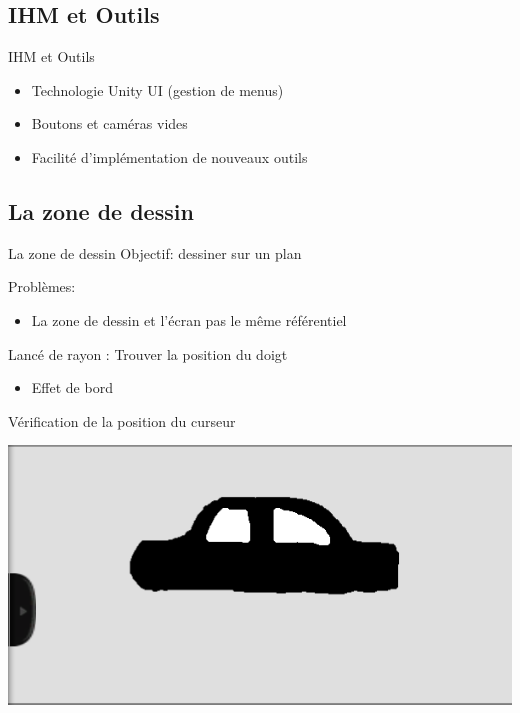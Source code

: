 \documentclass[a4paper,10pt]{beamer}
\begin{document}
	\subsection{IHM et Outils}
	\begin{frame}{IHM et Outils}

				\begin{itemize}
					\item Technologie Unity UI (gestion de menus)
					\item Boutons et caméras vides
					\item Facilité d'implémentation de nouveaux outils
				\end{itemize}
			
	\end{frame}
	

	\subsection{La zone de dessin}
	\begin{frame}{La zone de dessin}
		Objectif: dessiner sur un plan
			
		Problèmes:
			\begin{itemize}
				\item La zone de dessin et l'écran pas le même référentiel
				
			\end{itemize} 
			Lancé de rayon : 
			Trouver la position du doigt
			\begin{itemize}
				\item Effet de bord
			\end{itemize}
			Vérification de la position du curseur	
		\centerline{\includegraphics[scale=0.3]{images/Nono/img1.png}}
	\end{frame}
	
\end{document}
